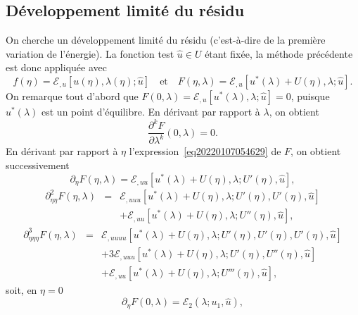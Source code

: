 \documentclass[12pt, final]{amsart}
\begin{document}
\subsection{Développement limité du
résidu}\label{sec20211112182000}

On cherche un développement limité du résidu (c'est-à-dire de
la première variation de l'énergie). La fonction test $\hat{u} \in U$
étant fixée, la méthode précédente est donc appliquée
avec
\begin{equation}
  \label{eq20220107054629} f (\eta) =\mathcal{E}_{, u} [u (\eta), \lambda
  (\eta) ; \hat{u}] \quad \text{et} \quad F (\eta, \lambda) =\mathcal{E}_{, u}
  [u^{\ast} (\lambda) + U (\eta), \lambda ; \hat{u}] .
\end{equation}
On remarque tout d'abord que $F (0, \lambda) =\mathcal{E}_{, u} [u^{\ast}
(\lambda), \lambda ; \hat{u}] = 0$, puisque $u^{\ast} (\lambda)$ est un point
d'équilibre. En dérivant par rapport à $\lambda$, on obtient
\begin{equation}
  \label{eq20211112164240} \frac{\partial^k F}{\partial \lambda^k} (0,
  \lambda) = 0.
\end{equation}
En dérivant par rapport à $\eta$ l'expression~\eqref{eq20220107054629}
de $F$, on obtient successivement
\begin{equation}
  \partial_{\eta} F (\eta, \lambda) =\mathcal{E}_{, u  u} [u^{\ast}
  (\lambda) + U (\eta), \lambda ; U' (\eta), \hat{u}],
\end{equation}
\begin{eqnarray}
  \partial_{\eta  \eta}^2 F (\eta, \lambda) & = & \mathcal{E}_{, u
   u  u} [u^{\ast} (\lambda) + U (\eta), \lambda ; U' (\eta),
  U' (\eta), \hat{u}] \nonumber\\
  &  &  +\mathcal{E}_{, u  u} [u^{\ast} (\lambda) + U
  (\eta), \lambda ; U'' (\eta), \hat{u}],
\end{eqnarray}
\begin{eqnarray}
  \partial_{\eta  \eta  \eta}^3 F (\eta, \lambda) & = &
  \mathcal{E}_{, u  u  u  u} [u^{\ast} (\lambda) + U
  (\eta), \lambda ; U' (\eta), U' (\eta), U' (\eta), \hat{u}] \nonumber\\
  &  &  + 3\mathcal{E}_{, u  u  u} [u^{\ast}
  (\lambda) + U (\eta), \lambda ; U' (\eta), U'' (\eta), \hat{u}] \nonumber\\
  &  &  +\mathcal{E}_{, u  u} [u^{\ast} (\lambda) + U
  (\eta), \lambda ; U''' (\eta), \hat{u}],
\end{eqnarray}
soit, en $\eta = 0$
\begin{equation}
  \partial_{\eta} F (0, \lambda) =\mathcal{E}_2 (\lambda ; u_1, \hat{u}),
\end{equation}
\end{document}
